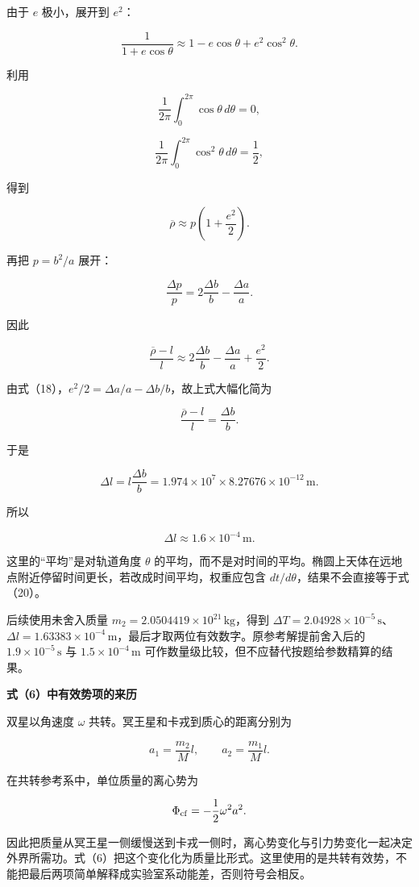 \documentclass[12pt,a4paper,UTF8]{ctexart}
\begin{document}
由于 \(e\) 极小，展开到 \(e^2\)：

\[
\frac1{1+e\cos\theta}
\approx1-e\cos\theta+e^2\cos^2\theta.
\]

利用

\[
\frac1{2\pi}\int_0^{2\pi}\cos\theta\,d\theta=0,
\]

\[
\frac1{2\pi}\int_0^{2\pi}\cos^2\theta\,d\theta=\frac12,
\]

得到

\[
\overline\rho\approx p\left(1+\frac{e^2}{2}\right).
\tag{20}
\]

再把 \(p=b^2/a\) 展开：

\[
\frac{\Delta p}{p}
=2\frac{\Delta b}{b}-\frac{\Delta a}{a}.
\]

因此

\[
\frac{\overline\rho-l}{l}
\approx2\frac{\Delta b}{b}-\frac{\Delta a}{a}+\frac{e^2}{2}.
\]

由式（18），\(e^2/2=\Delta a/a-\Delta b/b\)，故上式大幅化简为

\[
\frac{\overline\rho-l}{l}
=\frac{\Delta b}{b}.
\tag{21}
\]

于是

\[
\Delta l=l\frac{\Delta b}{b}
=1.974\times10^7\times8.27676\times10^{-12}\,\mathrm m.
\]

所以

\[
\boxed{\Delta l\approx1.6\times10^{-4}\,\mathrm m}.
\tag{22}
\]

这里的``平均''是对轨道角度 \(\theta\)
的平均，而不是对时间的平均。椭圆上天体在远地点附近停留时间更长，若改成时间平均，权重应包含
\(dt/d\theta\)，结果不会直接等于式（20）。

后续使用未舍入质量 \(m_2=2.0504419\times10^{21}\,\mathrm{kg}\)，得到
\(\Delta T=2.04928\times10^{-5}\,\mathrm s\)、\(\Delta l=1.63383\times10^{-4}\,\mathrm m\)，最后才取两位有效数字。原参考解提前舍入后的
\(1.9\times10^{-5}\,\mathrm s\) 与 \(1.5\times10^{-4}\,\mathrm m\)
可作数量级比较，但不应替代按题给参数精算的结果。

\textbf{式（6）中有效势项的来历}

双星以角速度 \(\omega\) 共转。冥王星和卡戎到质心的距离分别为

\[
a_1=\frac{m_2}{M}l,
\qquad
a_2=\frac{m_1}{M}l.
\]

在共转参考系中，单位质量的离心势为

\[
\Phi_{\rm cf}=-\frac12\omega^2a^2.
\]

因此把质量从冥王星一侧缓慢送到卡戎一侧时，离心势变化与引力势变化一起决定外界所需功。式（6）把这个变化化为质量比形式。这里使用的是共转有效势，不能把最后两项简单解释成实验室系动能差，否则符号会相反。
\end{document}
